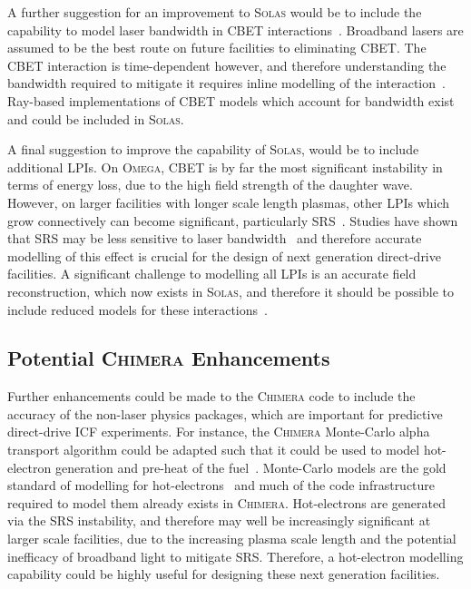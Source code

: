 A further suggestion for an improvement to \textsc{Solas} would be to include the capability to model laser bandwidth in \ac{CBET} interactions~\cite{follett_raybased_2023}.
Broadband lasers are assumed to be the best route on future facilities to eliminating \ac{CBET}.
The \ac{CBET} interaction is time-dependent however, and therefore understanding the bandwidth required to mitigate it requires inline modelling of the interaction~\cite{colaitis_exploration_2023}.
Ray-based implementations of \ac{CBET} models which account for bandwidth exist and could be included in \textsc{Solas}.

A final suggestion to improve the capability of \textsc{Solas}, would be to include additional \ac{LPIs}.
On \textsc{Omega}, \ac{CBET} is by far the most significant instability in terms of energy loss, due to the high field strength of the daughter wave.
However, on larger facilities with longer scale length plasmas, other \ac{LPIs} which grow connectively can become significant, particularly \ac{SRS}~\cite{scott_shock_2021}.
Studies have shown that \ac{SRS} may be less sensitive to laser bandwidth~\cite{zhao_mitigation_2022} and therefore accurate modelling of this effect is crucial for the design of next generation direct-drive facilities.
A significant challenge to modelling all \ac{LPIs} is an accurate field reconstruction, which now exists in \textsc{Solas}, and therefore it should be possible to include reduced models for these interactions~\cite{debayle_unified_2019}.

\subsection{Potential \textsc{Chimera} Enhancements}

Further enhancements could be made to the \textsc{Chimera} code to include the accuracy of the non-laser physics packages, which are important for predictive direct-drive \ac{ICF} experiments.
For instance, the \textsc{Chimera} Monte-Carlo alpha transport algorithm could be adapted such that it could be used to model hot-electron generation and pre-heat of the fuel~\cite{tong_burn_2019}.
Monte-Carlo models are the gold standard of modelling for hot-electrons~\cite{barlow_role_2022,tentori_3d_2022,tentori_3d_2022a} and much of the code infrastructure required to model them already exists in \textsc{Chimera}.
Hot-electrons are generated via the \ac{SRS} instability, and therefore may well be increasingly significant at larger scale facilities, due to the increasing plasma scale length and the potential inefficacy of broadband light to mitigate \ac{SRS}.
Therefore, a hot-electron modelling capability could be highly useful for designing these next generation facilities.

